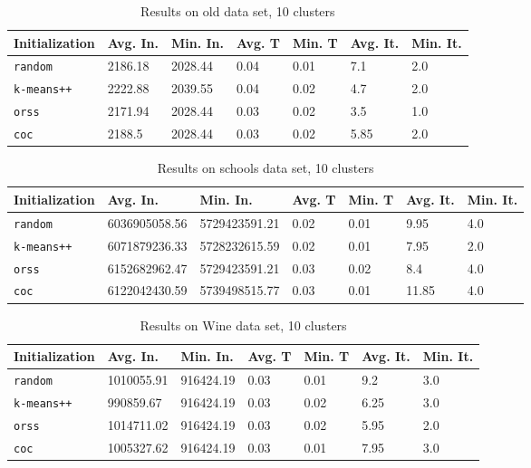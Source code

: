 \begin{table}[p]
	\begin{center}
		\begin{tabular}{|l|l|l|l|l|l|l|}
			\hline
			Initialization & Avg. In. & Min. In. & Avg. T & Min. T & Avg. It. & Min. It.\\\hline
			\texttt{random} & 2186.18 & 2028.44 & 0.04 & 0.01 & 7.1 & 2.0\\\hline
			\texttt{k-means++} & 2222.88 & 2039.55 & 0.04 & 0.02 & 4.7 & 2.0\\\hline
			\texttt{orss} & 2171.94 & 2028.44 & 0.03 & 0.02 & 3.5 & 1.0\\\hline
			\texttt{coc} & 2188.5 & 2028.44 & 0.03 & 0.02 & 5.85 & 2.0\\\hline
		\end{tabular}
		\caption{Results on old data set, 10 clusters}
		\label{tbl:old10}
	\end{center}
\end{table}

\begin{table}[p]
	\begin{center}
		\begin{tabular}{|l|l|l|l|l|l|l|}
			\hline
			Initialization & Avg. In. & Min. In. & Avg. T & Min. T & Avg. It. & Min. It.\\\hline
			\texttt{random} & 6036905058.56 & 5729423591.21 & 0.02 & 0.01 & 9.95 & 4.0\\\hline
			\texttt{k-means++} & 6071879236.33 & 5728232615.59 & 0.02 & 0.01 & 7.95 & 2.0\\\hline
			\texttt{orss} & 6152682962.47 & 5729423591.21 & 0.03 & 0.02 & 8.4 & 4.0\\\hline
			\texttt{coc} & 6122042430.59 & 5739498515.77 & 0.03 & 0.01 & 11.85 & 4.0\\\hline
		\end{tabular}
		\caption{Results on schools data set, 10 clusters}
		\label{tbl:schools10}
	\end{center}
\end{table}

\begin{table}[p]
	\begin{center}
		\begin{tabular}{|l|l|l|l|l|l|l|}
			\hline
			Initialization & Avg. In. & Min. In. & Avg. T & Min. T & Avg. It. & Min. It.\\\hline
			\texttt{random} & 1010055.91 & 916424.19 & 0.03 & 0.01 & 9.2 & 3.0\\\hline
			\texttt{k-means++} & 990859.67 & 916424.19 & 0.03 & 0.02 & 6.25 & 3.0\\\hline
			\texttt{orss} & 1014711.02 & 916424.19 & 0.03 & 0.02 & 5.95 & 2.0\\\hline
			\texttt{coc} & 1005327.62 & 916424.19 & 0.03 & 0.01 & 7.95 & 3.0\\\hline
		\end{tabular}
		\caption{Results on Wine data set, 10 clusters}
		\label{tbl:Wine10}
	\end{center}
\end{table}

